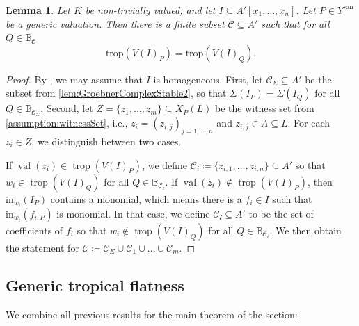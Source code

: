 \documentclass[12pt,reqno,a4paper]{amsart}
\theoremstyle{theoremstyle}
\newtheorem{lemma}[theorem]{Lemma}
\theoremstyle{examplestyle}
\theoremstyle{algorithmstyle}
\DeclareMathOperator{\trop}{trop}
\DeclareMathOperator{\val}{val}
\begin{document}
\begin{lemma}\label{lem:fiberwiseTropicalizationLocallyConstant}
  Let $K$ be non-trivially valued, and let $I\subseteq A'[x_1,\dots,x_n]$.  Let $P\in{Y'^{\mathrm{an}}}$ be a generic valuation. Then there is a finite subset $\mathcal{C}\subseteq A'$ such that for all $Q\in \mathbb{B}_{\mathcal{C}}$
  \begin{equation*}
    \mathrm{trop}(V(I)_{P})=\mathrm{trop}(V(I)_{Q}).
  \end{equation*}
\end{lemma}
\begin{proof}
  By \cite[Proposition 3.2.8]{MS15}, we may assume that $I$ is homogeneous. First, let $\mathcal C_\Sigma\subseteq A'$ be the subset from \cref{lem:GroebnerComplexStable2}, so that $\Sigma(I_P)=\Sigma(I_Q)$ for all $Q\in\mathbb{B}_{\mathcal C_\Sigma}$.
  Second, let $Z=\{z_1,\dots,z_m\}\subseteq X_P(L)$ be the witness set from \cref{assumption:witnessSet}, i.e., $z_i=(z_{i,j})_{j=1,\dots,n}$ and $z_{i,j}\in A\subseteq L$.  For each $z_i\in Z$, we distinguish between two cases.

  If $\val(z_i)\in\trop(V(I)_P)$, we define $\mathcal{C}_i\coloneqq\{z_{i,1},\dots,z_{i,n}\}\subseteq A'$ so that $w_i\in \trop(V(I)_Q)$ for all $Q\in\mathbb{B}_{\mathcal C_i}$.
  If $\val(z_i)\notin\trop(V(I)_P)$, then $\mathrm{in}_{w_i}(I_{P})$ contains a monomial, which means there is a $f_{i}\in I$ such that $\mathrm{in}_{w_i}(f_{i,P})$ is monomial. In that case, we define $\mathcal{C_i}\subseteq A'$ to be the set of coefficients of $f_{i}$ so that $w_i\notin \trop(V(I)_Q)$ for all $Q\in\mathbb{B}_{\mathcal C_i}$.
  We then obtain the statement for $\mathcal C\coloneqq \mathcal C_\Sigma\cup \mathcal C_1\cup\dots\cup\mathcal C_m$.
\end{proof}

\subsection*{Generic tropical flatness}
We combine all previous results for the main theorem of the section:
\end{document}
